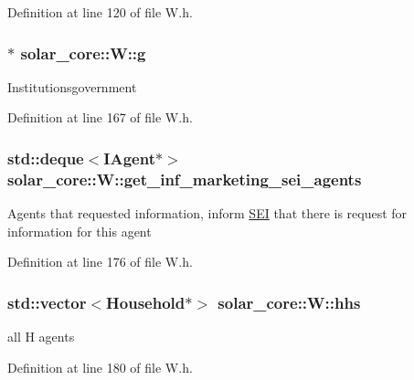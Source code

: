 Definition at line 120 of file W.\+h.

\hypertarget{classsolar__core_1_1_w_a9e50ef0da579cdfc3da22c16a492bc44}{}
\subsubsection[{g}]{$\ast$ solar\+\_\+core\+::\+W\+::g}\label{classsolar__core_1_1_w_a9e50ef0da579cdfc3da22c16a492bc44}
Institutionsgovernment 

Definition at line 167 of file W.\+h.

\hypertarget{classsolar__core_1_1_w_a81b5469757f203c9619ff69323ac0f77}{}
\subsubsection[{get\+\_\+inf\+\_\+marketing\+\_\+sei\+\_\+agents}]{\setlength{\rightskip}{0pt plus 5cm}std\+::deque$<${\bf I\+Agent}$\ast$$>$ solar\+\_\+core\+::\+W\+::get\+\_\+inf\+\_\+marketing\+\_\+sei\+\_\+agents\hspace{0.3cm}{\ttfamily [protected]}}\label{classsolar__core_1_1_w_a81b5469757f203c9619ff69323ac0f77}
Agents that requested information, inform \hyperlink{classsolar__core_1_1_s_e_i}{S\+E\+I} that there is request for information for this agent 

Definition at line 176 of file W.\+h.

\hypertarget{classsolar__core_1_1_w_a17c012ff8b17890ed33923cec6d87be3}{}
\subsubsection[{hhs}]{\setlength{\rightskip}{0pt plus 5cm}std\+::vector$<${\bf Household}$\ast$$>$ solar\+\_\+core\+::\+W\+::hhs\hspace{0.3cm}{\ttfamily [protected]}}\label{classsolar__core_1_1_w_a17c012ff8b17890ed33923cec6d87be3}
all H agents 

Definition at line 180 of file W.\+h.

